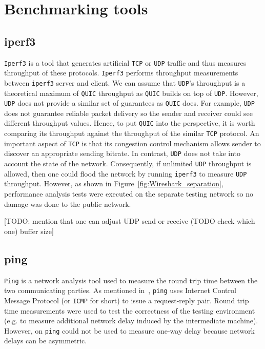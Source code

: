 \documentclass[12pt,a4paper,twoside,openright]{report}
\begin{document}
\section{Benchmarking tools}
\subsection{iperf3}
\texttt{Iperf3} is a tool that generates artificial \texttt{TCP} or \texttt{UDP} traffic and thus measures throughput of these protocols.
\texttt{Iperf3} performs throughput measurements between \texttt{iperf3} server and client.
We can assume that \texttt{UDP}'s throughput is a theoretical maximum of \texttt{QUIC} throughput as \texttt{QUIC} builds on top of \texttt{UDP}.
However, \texttt{UDP} does not provide a similar set of guarantees as \texttt{QUIC} does.
For example, \texttt{UDP} does not guarantee reliable packet delivery so the sender and receiver could see different throughput values.
Hence, to put \texttt{QUIC} into the perspective, it is worth comparing its throughput against the throughput of the similar \texttt{TCP} protocol.
An important aspect of \texttt{TCP} is that its congestion control mechanism allows sender to discover an appropriate sending bitrate.
In contrast, \texttt{UDP} does not take into account the state of the network.
Consequently, if unlimited \texttt{UDP} throughput is allowed, then one could flood the network by running \texttt{iperf3} to measure \texttt{UDP} throughput.
However, as shown in Figure~\ref{fig:Wireshark_separation}, performance analysis tests were executed on the separate testing network so no damage was done to the public network.


[TODO: mention that one can adjust UDP send or receive (TODO check which one) buffer size]



\subsection{ping}
\texttt{Ping} is a network analysis tool used to measure the round trip time between the two communicating parties.
As mentioned in~\cite{internet-control-message-protocol-icmp}, \texttt{ping} uses Internet Control Message Protocol (or \texttt{ICMP} for short) to issue a request-reply pair.
Round trip time measurements were used to test the correctness of the testing environment (e.g. to measure additional network delay induced by the intermediate machine).
However, on \texttt{ping} could not be used to measure one-way delay because network delays can be asymmetric.
\end{document}
